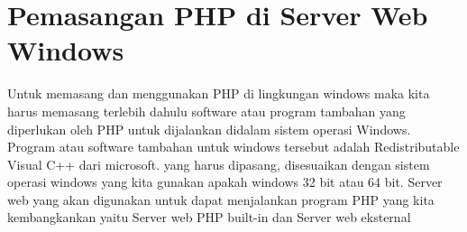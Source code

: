 \section{Pemasangan PHP di Server Web Windows}
Untuk memasang dan menggunakan PHP di lingkungan windows maka kita harus memasang terlebih dahulu software atau program tambahan yang diperlukan oleh PHP untuk dijalankan didalam sistem operasi Windows. Program atau software tambahan untuk windows tersebut adalah Redistributable Visual C++ dari microsoft. yang harus dipasang, disesuaikan dengan sistem operasi windows yang kita gunakan apakah windows 32 bit atau 64 bit. Server web yang akan digunakan untuk dapat menjalankan program PHP yang kita kembangkankan yaitu Server web PHP built-in dan Server web eksternal

